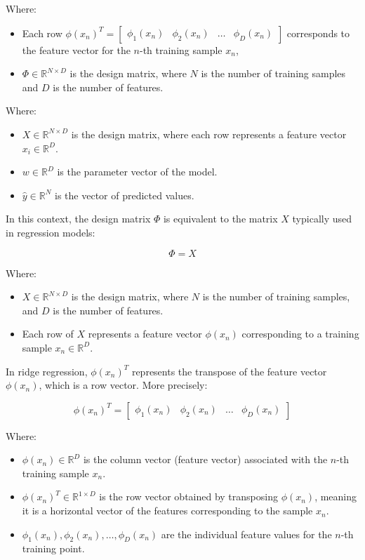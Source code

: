 Where:
\begin{itemize}
    \item Each row \( \phi(x_n)^T = \begin{bmatrix} \phi_1(x_n) & \phi_2(x_n) & \dots & \phi_D(x_n) \end{bmatrix} \) corresponds to the feature vector for the \( n \)-th training sample \( x_n \),
    \item \( \Phi \in \mathbb{R}^{N \times D} \) is the design matrix, where \( N \) is the number of training samples and \( D \) is the number of features.
\end{itemize}


Where:
\begin{itemize}
    \item \( X \in \mathbb{R}^{N \times D} \) is the design matrix, where each row represents a feature vector \( x_i \in \mathbb{R}^D \).
    \item \( w \in \mathbb{R}^D \) is the parameter vector of the model.
    \item \( \hat{y} \in \mathbb{R}^N \) is the vector of predicted values.
\end{itemize}




In this context, the design matrix \( \Phi \) is equivalent to the matrix \( X \) typically used in regression models:

\[
\Phi = X
\]

Where:
\begin{itemize}
    \item \( X \in \mathbb{R}^{N \times D} \) is the design matrix, where \( N \) is the number of training samples, and \( D \) is the number of features.
    \item Each row of \( X \) represents a feature vector \( \phi(x_n) \) corresponding to a training sample \( x_n \in \mathbb{R}^D \).
\end{itemize}

\newpage

In ridge regression, \( \phi(x_n)^T \) represents the transpose of the feature vector \( \phi(x_n) \), which is a row vector. More precisely:

\[
\phi(x_n)^T = \begin{bmatrix} \phi_1(x_n) & \phi_2(x_n) & \dots & \phi_D(x_n) \end{bmatrix}
\]


Where:
\begin{itemize}
    \item \( \phi(x_n) \in \mathbb{R}^D \) is the column vector (feature vector) associated with the \( n \)-th training sample \( x_n \).
    \item \( \phi(x_n)^T \in \mathbb{R}^{1 \times D} \) is the row vector obtained by transposing \( \phi(x_n) \), meaning it is a horizontal vector of the features corresponding to the sample \( x_n \).
    \item \( \phi_1(x_n), \phi_2(x_n), \dots, \phi_D(x_n) \) are the individual feature values for the \( n \)-th training point.
\end{itemize}

